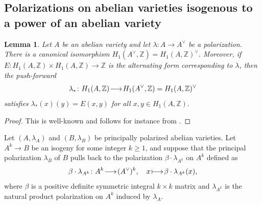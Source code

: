 \documentclass[a4paper,11pt,reqno]{amsart}
\makeatletter
\numberwithin{equation}{section}
\theoremstyle{plain}
\newtheorem{lemma}[theorem]{Lemma}
\theoremstyle{definition}
\newcommand{\Z}{\mathbb Z}
\renewcommand{\longrightarrow}{\xymatrix@1@=15pt{\ar[r]&}}
\renewcommand{\mapsto}{\xymatrix@1@=15pt{\ar@{|->}[r]&}}
\makeatother
\begin{document}
\subsection{Polarizations on abelian varieties isogenous to a power of an abelian variety} \label{appendix:polarizations}

\begin{lemma} \label{lemma:push-forward-polarization}
    Let $A$ be an abelian variety and let $\lambda \colon A \to A^\vee$ be a polarization. There is a canonical isomorphism $H_1(A^\vee,\Z) = H_1(A,\Z)^\vee$. Moreover, if $E \colon H_1(A,\Z) \times H_1(A,\Z) \to \Z$ is the alternating form corresponding to $\lambda$, then the push-forward
    \[
    \lambda_\ast \colon H_1(A,\Z) \longrightarrow H_1(A^\vee,\Z) = H_1(A,\Z)^\vee
    \]
    satisfies
    $
    \lambda_\ast(x)(y) = E(x,y)$ for all $x,y \in H_1(A,\Z). 
    $
\end{lemma}
\begin{proof}
This is well-known and follows for instance from \cite[Lemma 2.4.5]{birkenhakelange-complexAVs}.
\end{proof}

    Let $(A, \lambda_A)$ and $(B, \lambda_B)$ be principally polarized abelian varieties.
    Let $A^k \to B$ be an isogeny for some integer $k \geq 1$, and suppose that the principal polarization $\lambda_B$ of $B$ pulls back to the polarization $\beta \cdot \lambda_{A^k}$ on $A^k$ defined as 
    \[
   \beta \cdot \lambda_{A^k} \colon A^k \longrightarrow (A^\vee)^k, \quad x \mapsto \beta \cdot \lambda_{A^k}(x),
    \]
    where $\beta$ is a positive definite symmetric integral $k \times k$ matrix and $\lambda_{A^k}$ is the natural product polarization on $A^k$ induced by $\lambda_A$. 
    
\end{document}
